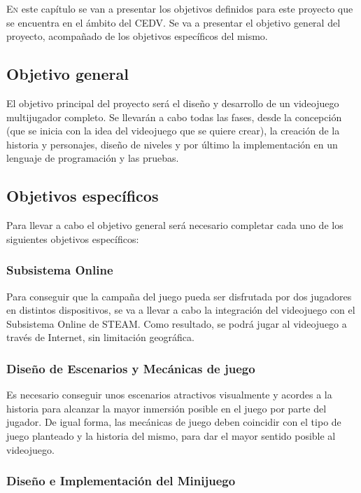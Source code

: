\lettrine[lines=2,findent=2pt,nindent=3pt,loversize=0.1]{\textcolor[gray]{0.4}{E}}{n} este capítulo se van a presentar los objetivos definidos para este proyecto que se encuentra en el ámbito del \ac{CEDV}. Se va a presentar el objetivo general del proyecto, acompañado de los objetivos específicos del mismo.

\subsection{Objetivo general}

El objetivo principal del proyecto será el diseño y desarrollo de un videojuego multijugador completo. Se llevarán a cabo todas las fases, desde la concepción (que se inicia con la idea del videojuego que se quiere crear), la creación de la historia y personajes, diseño de niveles y por último la implementación en un lenguaje de programación y las pruebas.

\subsection{Objetivos específicos}

Para llevar a cabo el objetivo general será necesario completar cada uno de los siguientes objetivos específicos:

\subsubsection{Subsistema Online}

Para conseguir que la campaña del juego pueda ser disfrutada por dos jugadores en distintos dispositivos, se va a llevar a cabo la integración del videojuego con el Subsistema Online de STEAM. Como resultado, se podrá jugar al videojuego a través de Internet, sin limitación geográfica.

\subsubsection{Diseño de Escenarios y Mecánicas de juego}

Es necesario conseguir unos escenarios atractivos visualmente y acordes a la historia para alcanzar la mayor inmersión posible en el juego por parte del jugador. De igual forma, las mecánicas de juego deben coincidir con el tipo de juego planteado y la historia del mismo, para dar el mayor sentido posible al videojuego.

\subsubsection{Diseño e Implementación del Minijuego}

